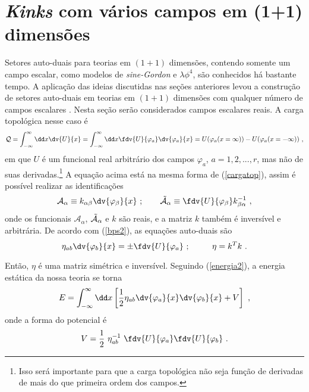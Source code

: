 \chapter[\textit{Kinks} com vários campos em (1+1) dimensões]{\textit{Kinks} com vários campos em (1+1) dimensões}
\label{(1+1) dimensões}

Setores auto-duais para teorias em $(1+1)$ dimensões, contendo somente um campo escalar, como modelos de \textit{sine-Gordon} e $\lambda\phi^4$, são conhecidos há bastante tempo. A aplicação das ideias discutidas nas seções anteriores levou a construção de setores auto-duais em teorias em $(1+1)$ dimensões com qualquer número de campos escalares \cite{laf(1+1)}. Nesta seção serão considerados campos escalares reais. A carga topológica nesse caso é
\begin{equation}
    \mathcal{Q} = \int^{\infty}_{-\infty} \dd x \dv{U}{x} = \int^{\infty}_{-\infty}\dd x \fdv{U}{\varphi_a}\dv{\varphi_a}{x} = U(\varphi_a(x=\infty)) - U(\varphi_a(x=-\infty)) \ ,
\end{equation}
em que $U$ é um funcional real arbitrário dos campos $\varphi_a$, $a = 1,2,...,r$, mas não de suas derivadas.\footnote{Isso será importante para que a carga topológica não seja função de derivadas de mais do que primeira ordem dos campos.} A equação acima está na mesma forma de (\ref{cargatop}), assim é possível realizar as identificações
\begin{equation}
    \mathcal{A}_\alpha \equiv k_{\alpha\beta}\dv{\varphi_\beta}{x} \ ; \ \ \ \ \ \ \Tilde{\mathcal{A}}_\alpha \equiv \fdv{U}{\varphi_\beta}k^{-1}_{\beta\alpha} \ ,
\end{equation}
onde os funcionais $\mathcal{A}_\alpha$, $\Tilde{\mathcal{A}}_\alpha$ e $k$ são reais, e a matriz $k$ também é inversível e arbitrária. De acordo com (\ref{bps2}), as equações auto-duais são
\begin{equation}
    \eta_{ab}\dv{\varphi_b}{x} = \pm\fdv{U}{\varphi_a} \ ; \ \ \ \ \ \ \ \ \eta = k^{T}k \ .
    \label{bps1d}
\end{equation}

Então, $\eta$ é uma matriz simétrica e inversível. Seguindo (\ref{energia2}), a energia estática da nossa teoria se torna
\begin{equation}
    E = \int^{\infty}_{-\infty} \dd x \left[\dfrac{1}{2}\eta_{ab}\dv{\varphi_a}{x}\dv{\varphi_b}{x} + V \right] \ ,
    \label{funcE}
\end{equation}
onde a forma do potencial é
\begin{equation}
    V = \dfrac{1}{2} \ \eta^{-1}_{ab} \ \fdv{U}{\varphi_a}\fdv{U}{\varphi_b} \ .
    \label{potencial}
\end{equation}


